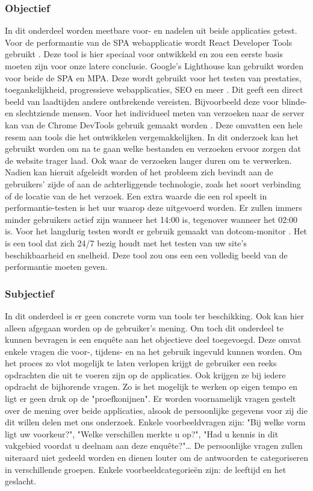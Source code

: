 \documentclass{hogent-article}
\begin{document}
\subsubsection{Objectief}
In dit onderdeel worden meetbare voor- en nadelen uit beide applicaties getest.
Voor de performantie van de SPA webapplicatie wordt React Developer Tools gebruikt \autocite{RDT2022}.
Deze tool is hier speciaal voor ontwikkeld en zou een eerste basis moeten zijn voor onze latere conclusie.
Google's Lighthouse kan gebruikt worden voor beide de SPA en MPA.
Deze wordt gebruikt voor het testen van prestaties, toegankelijkheid, progressieve webapplicaties, SEO en meer \autocite{GoogleLighthouse2022}.
Dit geeft een direct beeld van laadtijden andere ontbrekende vereisten.
Bijvoorbeeld deze voor blinde- en slechtziende mensen.
Voor het individueel meten van verzoeken naar de server kan van de Chrome DevTools gebruik gemaakt worden \autocite{GoogleDevTools2016}.
Deze omvatten een hele resem aan tools die het ontwikkelen vergemakkelijken.
In dit onderzoek kan het gebruikt worden om na te gaan welke bestanden en verzoeken ervoor zorgen dat de website trager laad.
Ook waar de verzoeken langer duren om te verwerken.
Nadien kan hieruit afgeleidt worden of het probleem zich bevindt aan de gebruikers' zijde of aan de achterliggende technologie, zoals het soort verbinding of de locatie van de het verzoek.
Een extra waarde die een rol speelt in performantie-testen is het uur waarop deze uitgevoerd worden.
Er zullen immers minder gebruikers actief zijn wanneer het 14:00 is, tegenover wanneer het 02:00 is.
Voor het langdurig testen wordt er gebruik gemaakt van dotcom-monitor \autocite{dotcom-monitor2022}.
Het is een tool dat zich 24/7 bezig houdt met het testen van uw site's beschikbaarheid en snelheid.
Deze tool zou ons een een volledig beeld van de performantie moeten geven.

\subsubsection{Subjectief}
In dit onderdeel is er geen concrete vorm van tools ter beschikking.
Ook kan hier alleen afgegaan worden op de gebruiker's mening.
Om toch dit onderdeel te kunnen bevragen is een enquête aan het objectieve deel toegevoegd.
Deze omvat enkele vragen die voor-, tijdens- en na het gebruik ingevuld kunnen worden.
Om het proces zo vlot mogelijk te laten verlopen krijgt de gebruiker een reeks opdrachten die uit te voeren zijn op de applicaties.
Ook krijgen ze bij iedere opdracht de bijhorende vragen.
Zo is het mogelijk te werken op eigen tempo en ligt er geen druk op de "proefkonijnen".
Er worden voornamelijk vragen gestelt over de mening over beide applicaties, alsook de persoonlijke gegevens voor zij die dit willen delen met ons onderzoek.
Enkele voorbeeldvragen zijn:
"Bij welke vorm ligt uw voorkeur?",
"Welke verschillen merkte u op?",
"Had u kennis in dit vakgebied voordat u deelnam aan deze enquête?"\dots
De persoonlijke vragen zullen uiteraard niet gedeeld worden en dienen louter om de antwoorden te categoriseren in verschillende groepen.
Enkele voorbeeldcategorieën zijn: de leeftijd en het geslacht.
\end{document}
